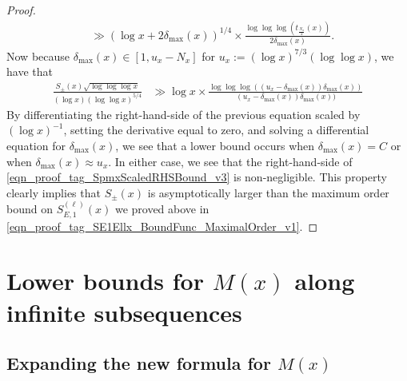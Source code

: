 \documentclass[11pt,reqno,a4letter]{article}
\numberwithin{figure}{section}
\numberwithin{table}{section}
\theoremstyle{plain}
\numberwithin{theorem}{section}
\theoremstyle{definition}
\begin{document}
\begin{proof}
\begin{align*}
     & \gg (\log x + 2 \delta_{\max}(x))^{1/4} \times \frac{\log\log\log(t_{\frac{N_x}{2}}(x))}{2 \delta_{\max}(x)}. 
\end{align*} 
Now because $\delta_{\max}(x) \in [1, u_x - N_x]$ for $u_x := (\log x)^{7/3} (\log\log x)$, 
we have that 
\begin{align} 
\label{eqn_proof_tag_SpmxScaledRHSBound_v3} 
\frac{S_{\pm}(x) \sqrt{\log\log\log x}}{(\log x) (\log\log x)^{5/4}} & \gg 
     \log x \times \frac{\log\log\log((u_x - \delta_{\max}(x)) 
     \delta_{\max}(x))}{(u_x - \delta_{\max}(x)) \delta_{\max}(x))} 
\end{align} 
By differentiating the right-hand-side of the previous equation scaled by 
$(\log x)^{-1}$, setting the derivative equal to zero, and 
solving a differential equation for $\delta_{\max}(x)$, we see that a lower bound occurs 
when $\delta_{\max}(x) = C$ or when $\delta_{\max}(x) \approx u_x$. In either case, we see that the 
right-hand-side of \eqref{eqn_proof_tag_SpmxScaledRHSBound_v3} is non-negligible. 
This property clearly implies that $S_{\pm}(x)$ is asymptotically larger than the 
maximum order bound on $S_{E,1}^{(\ell)}(x)$ we proved above in 
\eqref{eqn_proof_tag_SE1Ellx_BoundFunc_MaximalOrder_v1}. 
\end{proof} 

\newpage 
\section{Lower bounds for $M(x)$ along infinite subsequences} 
\label{Section_KeyApplications} 

\subsection{Expanding the new formula for $M(x)$} 
\end{document}
